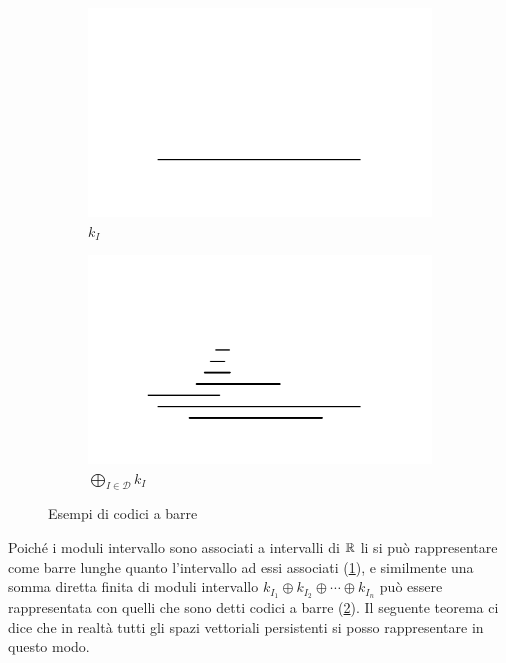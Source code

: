 \begin{figure}[ht]
  \begin{center}
    \begin{subfigure}[b]{.4\textwidth}
      \includegraphics[width=\textwidth]{gfx/barcodes_single.pdf}
      \caption{$k_I$}\label{fig:barcodes:single}
    \end{subfigure}
    \begin{subfigure}[b]{.4\textwidth}
      \includegraphics[width=\textwidth]{gfx/barcodes_multiple.pdf}
      \caption{$\bigoplus_{I\in\mathcal{D}} k_I$}\label{fig:barcodes:multiple}
    \end{subfigure}
    \caption{Esempi di codici a barre}  \label{fig:barcodes}
  \end{center}
\end{figure}


Poiché i moduli intervallo sono associati a intervalli di $\mathbb{R}$ li si può rappresentare come barre lunghe quanto l'intervallo ad essi associati (\cref{fig:barcodes:single}), e similmente una somma diretta finita di moduli intervallo
$k_{I_1}\oplus k_{I_2}\oplus\cdots \oplus k_{I_n}$ può essere rappresentata con quelli che sono detti codici a barre (\cref{fig:barcodes:multiple}). Il seguente teorema ci dice che in realtà tutti gli spazi vettoriali persistenti si posso rappresentare in questo modo.

